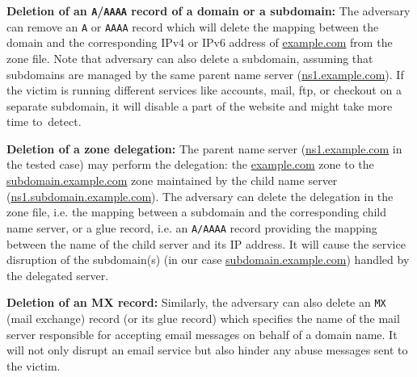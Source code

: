 \textbf{Deletion of an \texttt{A}/\texttt{AAAA} record of a domain or a subdomain:} The adversary can remove an \texttt{A} or \texttt{AAAA} record which will delete the mapping between the domain and the corresponding IPv4 or IPv6 address of \url{example.com} from the zone file. 
Note that adversary can also delete a subdomain, assuming that subdomains are managed by the same parent name server (\url{ns1.example.com}). 
If the victim is running different services like accounts, mail, ftp, or checkout on a separate subdomain, it will %
disable a part of the website and might take more time to~detect. 

 \textbf{Deletion of a zone delegation:} 
%
 The parent name server (\url{ns1.example.com} in the tested case) may perform the delegation: the \url{example.com} zone to the \url{subdomain.example.com} zone maintained by the child name server (\url{ns1.subdomain.example.com}).
 The adversary %
 can delete the delegation in the zone file, i.e. the mapping between a subdomain and the corresponding child name server, or a glue record, i.e. an \texttt{A/AAAA} record providing the mapping between the name of the child server and its IP address.
 It will cause the service disruption of the subdomain(s) (in our case \url{subdomain.example.com}) handled by the delegated server. %


\textbf{Deletion of an MX record:} Similarly, the adversary can also delete an \texttt{MX} (mail exchange) record (or its glue record) which specifies the name of the mail server responsible for accepting email messages on behalf of a domain name.
It will not only disrupt an email service but also hinder any abuse messages sent to the victim. 

